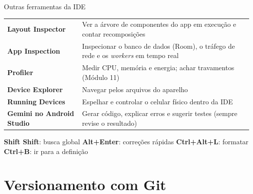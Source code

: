 \documentclass[aspectratio=169,10pt]{beamer}
\begin{document}
\begin{frame}{Outras ferramentas da IDE}
  \small
  \begin{tabularx}{\textwidth}{@{}l L@{}}
    \toprule
     &  \\
    \midrule
    \textbf{Layout Inspector} & Ver a árvore de componentes do app em execução e contar recomposições \\
    \textbf{App Inspection} & Inspecionar o banco de dados (Room), o tráfego de rede e os \emph{workers} em tempo real \\
    \textbf{Profiler} & Medir CPU, memória e energia; achar travamentos (Módulo 11) \\
    \textbf{Device Explorer} & Navegar pelos arquivos do aparelho \\
    \textbf{Running Devices} & Espelhar e controlar o celular físico dentro da IDE \\
    \textbf{Gemini no Android Studio} & Gerar código, explicar erros e sugerir testes (sempre revise o resultado) \\
    \bottomrule
  \end{tabularx}
  \vspace{4pt}
  \begin{dica}
    \textbf{Shift Shift}: busca global \quad \textbf{Alt+Enter}: correções rápidas \quad \textbf{Ctrl+Alt+L}: formatar \quad \textbf{Ctrl+B}: ir para a definição
  \end{dica}
\end{frame}

\section{Versionamento com Git}
\end{document}
